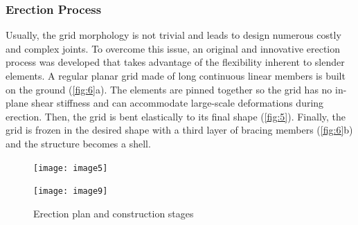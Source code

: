 \subsubsection{Erection Process}
Usually, the grid morphology is not trivial and leads to design numerous costly and complex joints. To overcome this issue, an original and innovative erection process was developed that takes advantage of the flexibility inherent to slender elements. A regular planar grid made of long continuous linear members is built on the ground (\autoref{fig:6}a). The elements are pinned together so the grid has no in-plane shear stiffness and can accommodate large-scale deformations during erection. Then, the grid is bent elastically to its final shape (\autoref{fig:5}). Finally, the grid is frozen in the desired shape with a third layer of bracing members (\autoref{fig:6}b) and the structure becomes a shell.
\begin{figure}[t]
	\begin{minipage}[b]{.70\linewidth}
		\centering\texttt{[image: image5]}
	\end{minipage} \hfill
	\begin{minipage}[b]{.25\linewidth}
		\centering\texttt{[image: image9]}	
	\end{minipage}
	\vspace{0.5cm}
	\caption{Erection plan and construction stages}\label{fig:6}
\end{figure}

%
%


